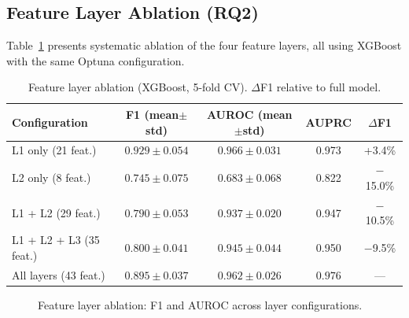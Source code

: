 \documentclass[11pt,a4paper]{article}
\begin{document}
\subsection{Feature Layer Ablation (RQ2)}
\label{sec:ablation}

Table~\ref{tab:ablation} presents systematic ablation of the four feature layers, all using XGBoost with the same Optuna configuration.

\begin{table}[t]
\centering
\caption{Feature layer ablation (XGBoost, 5-fold CV). $\Delta$F1 relative to full model.}
\label{tab:ablation}
\begin{tabular}{lcccc}
\toprule
\textbf{Configuration} & \textbf{F1 (mean$\pm$std)} & \textbf{AUROC (mean$\pm$std)} & \textbf{AUPRC} & \textbf{$\Delta$F1} \\
\midrule
L1 only (21 feat.) & $\mathbf{0.929\pm0.054}$ & $0.966\pm0.031$ & 0.973 & +3.4\% \\
L2 only (8 feat.)  & $0.745\pm0.075$ & $0.683\pm0.068$ & 0.822 & $-$15.0\% \\
L1 + L2 (29 feat.) & $0.790\pm0.053$ & $0.937\pm0.020$ & 0.947 & $-$10.5\% \\
L1 + L2 + L3 (35 feat.) & $0.800\pm0.041$ & $0.945\pm0.044$ & 0.950 & $-$9.5\% \\
All layers (43 feat.)    & $0.895\pm0.037$ & $\mathbf{0.962\pm0.026}$ & $\mathbf{0.976}$ & --- \\
\bottomrule
\end{tabular}
\end{table}

\begin{figure}[t]
\centering
{}
\caption{Feature layer ablation: F1 and AUROC across layer configurations.}
\label{fig:ablation}
\end{figure}
\end{document}
